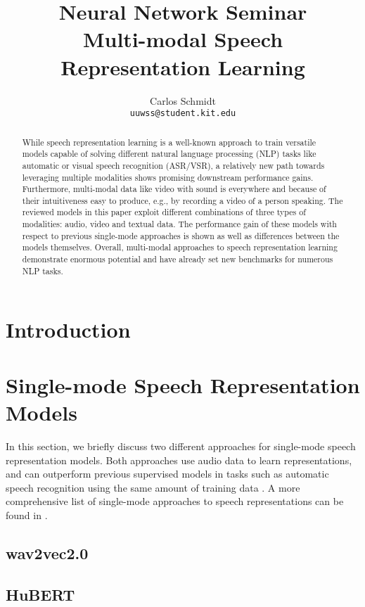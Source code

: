 \documentclass[11pt]{article}
\title{Neural Network Seminar\\Multi-modal Speech Representation Learning}
\author{Carlos Schmidt \\\texttt{uuwss@student.kit.edu}\\}
\begin{document}
\maketitle
\begin{abstract}
While speech representation learning is a well-known approach to train versatile models capable of solving different natural language processing (NLP) tasks like automatic or visual speech recognition (ASR/VSR), a relatively new path towards leveraging multiple modalities shows promising downstream performance gains. Furthermore, multi-modal data like video with sound is everywhere and because of their intuitiveness easy to produce, e.g., by recording a video of a person speaking. The reviewed models in this paper exploit different combinations of three types of modalities: audio, video and textual data. The performance gain of these models with respect to previous single-mode approaches is shown as well as differences between the models themselves. Overall, multi-modal approaches to speech representation learning demonstrate enormous potential and have already set new benchmarks for numerous NLP tasks.
\end{abstract}

\section{Introduction}

\section{Single-mode Speech Representation Models}\label{sec:single-mode}
In this section, we briefly discuss two different approaches for single-mode speech representation models. Both approaches use audio data to learn representations, and can outperform previous supervised models in tasks such as automatic speech recognition using the same amount of training data \cite{wav2vec20}. A more comprehensive list of single-mode approaches to speech representations can be found in \cite{srl-review}.
\subsection{wav2vec2.0}

\subsection{HuBERT}\label{sec:HuBERT}

\end{document}
